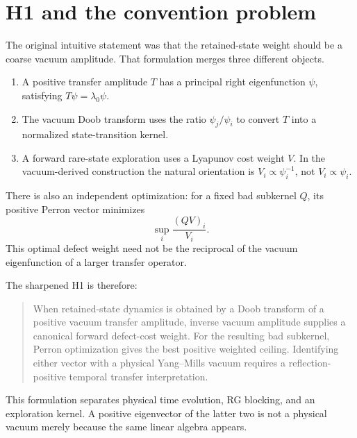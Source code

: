 \section{H1 and the convention problem}

The original intuitive statement was that the retained-state weight should
be a coarse vacuum amplitude.  That formulation merges three different
objects.

\begin{enumerate}[label=(\roman*)]
\item A positive transfer amplitude \(T\) has a principal right eigenfunction
\(\psi\), satisfying \(T\psi=\lambda_0\psi\).
\item The vacuum Doob transform uses the ratio \(\psi_j/\psi_i\) to convert
\(T\) into a normalized state-transition kernel.
\item A forward rare-state exploration uses a Lyapunov cost weight \(V\).  In
the vacuum-derived construction the natural orientation is
\(V_i\propto\psi_i^{-1}\), not \(V_i\propto\psi_i\).
\end{enumerate}

There is also an independent optimization: for a fixed bad subkernel \(Q\),
its positive Perron vector minimizes
\begin{equation}
 \sup_i\frac{(QV)_i}{V_i}.
\end{equation}
This optimal defect weight need not be the reciprocal of the vacuum
eigenfunction of a larger transfer operator.

The sharpened H1 is therefore:

\begin{quote}
When retained-state dynamics is obtained by a Doob transform of a positive
vacuum transfer amplitude, inverse vacuum amplitude supplies a canonical
forward defect-cost weight.  For the resulting bad subkernel, Perron
optimization gives the best positive weighted ceiling.  Identifying either
vector with a physical Yang--Mills vacuum requires a reflection-positive
temporal transfer interpretation.
\end{quote}

This formulation separates physical time evolution, RG blocking, and an
exploration kernel.  A positive eigenvector of the latter two is not a
physical vacuum merely because the same linear algebra appears.
